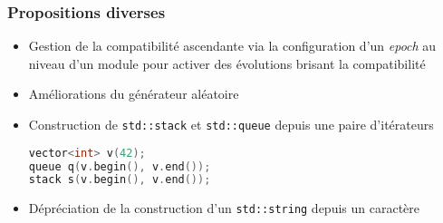 \documentclass[C++.tex]{subfiles}
\begin{document}
\begin{frame}[fragile]
	\frametitle{Propositions diverses}
	\begin{itemize}
		\item Gestion de la compatibilité ascendante via la configuration d'un \textit{epoch} au niveau d'un module pour activer des évolutions brisant la compatibilité


		\item Améliorations du générateur aléatoire
		\item Construction de \lstinline|std::stack| et \lstinline|std::queue| depuis une paire d'itérateurs

			\begin{lstlisting}[language=C++]
vector<int> v(42);
queue q(v.begin(), v.end());
stack s(v.begin(), v.end());
\end{lstlisting}

		
		\item Dépréciation de la construction d'un \lstinline|std::string| depuis un caractère
		
	\end{itemize}
\end{frame}
\end{document}
